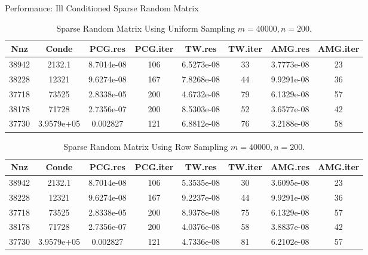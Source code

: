 Performance: Ill Conditioned Sparse Random Matrix

\begin{table}\label{table_spc}
\centering
\caption{Sparse Random Matrix Using Uniform Sampling $m = 40000, n = 200.$}
\begin{tabular}{|*{8}{c|}}\hline
     Nnz    &   Conde     &  PCG.res    &  PCG.iter   &   TW.res   &   TW.iter   &   AMG.res    &  AMG.iter \\\hline
    38942  &      2132.1  &  8.7014e-08   & 106    &     6.5273e-08   & 33     &    3.7773e-08  &  23   \\\hline
    38228   &      12321   & 9.6274e-08    & 167    &     7.8268e-08   & 44     &    9.9291e-08  &  36    \\\hline
    37718    &     73525    & 2.8338e-05    & 200    &     4.6732e-08   & 79     &    6.1329e-08  &  57    \\\hline
    38178     &    71728    & 2.7356e-07    & 200     &    8.5303e-08    &52      &   3.6577e-08   & 42     \\\hline
    37730    & 3.9579e+05  &    0.002827   & 121    &     6.8812e-08   & 76      &   3.2188e-08  &  58     \\\hline
\end{tabular}
\end{table}
\begin{table}
\centering
\caption{Sparse Random Matrix Using Row Sampling $m = 40000, n = 200.$}
\begin{tabular}{|*{8}{c|}}\hline
     Nnz    &   Conde    &    PCG.res    &  PCG.iter    &  TW.res    &  TW.iter  &   AMG.res    &  AMG.iter\\\hline
    38942  &      2132.1  &  8.7014e-08  &  106      &   5.3535e-08  &  30    &     3.6095e-08  &  23      \\\hline	
    38228   &      12321   & 9.6274e-08   & 167       &  9.2237e-08   & 44      &   9.9291e-08   & 36      \\\hline
    37718    &     73525   & 2.8338e-05    & 200       &  8.9378e-08   & 75      &   6.1329e-08   & 57      \\\hline
    38178     &   71728    & 2.7356e-07    & 200        & 4.0376e-08    &58       &  3.8837e-08    &42      \\\hline
    37730    & 3.9579e+05  &    0.002827  &  121      &   4.7336e-08   & 81      &   6.2102e-08   & 57  \\\hline


\end{tabular}
\end{table}

